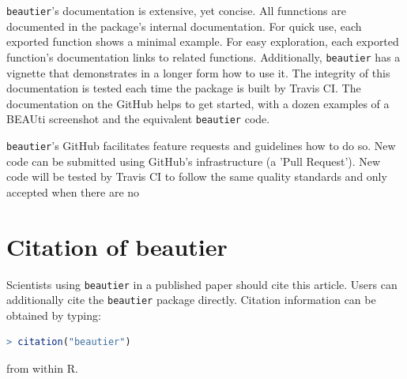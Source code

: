 \documentclass{article}
\begin{document}
\verb;beautier;'s documentation is extensive, yet concise. All funnctions are documented
in the package's internal documentation. For quick use, each exported function shows a minimal example. 
For easy exploration, each exported function's documentation links to related functions.
Additionally, \verb;beautier; has a vignette that demonstrates in a longer form how
to use it. The integrity of this documentation is tested each time the package is built by Travis CI.
The documentation on the GitHub helps to get started, with a dozen examples 
of a BEAUti screenshot and the equivalent \verb;beautier; code.

\verb;beautier;'s GitHub facilitates feature requests and guidelines how to do so.
New code can be submitted using GitHub's infrastructure (a 'Pull Request'). New
code will be tested by Travis CI to follow the same quality standards and only accepted
when there are no 


\section{Citation of beautier}

Scientists using \verb;beautier; in a published paper should cite this
article. Users can additionally cite the \verb;beautier; package 
directly. Citation information can be obtained by typing:

\begin{lstlisting}[language=R]
> citation("beautier")
\end{lstlisting}

from within R.




\begin{thebibliography}{}

\end{thebibliography}
\end{document}
